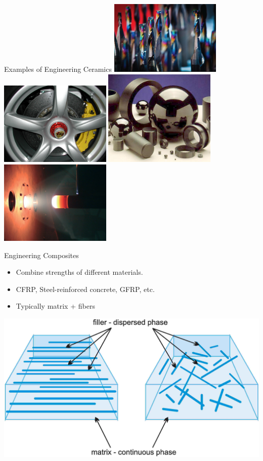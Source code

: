 \documentclass[10pt, svgnames]{beamer}
\begin{document}
\begin{frame}[label={sec:org6e82fde}]{Examples of Engineering Ceramics}
\centering
\includegraphics[width=0.4\textwidth]{pictures/diamond}
\includegraphics[width=0.4\textwidth]{pictures/silicon-carbide-disc-brake}
\includegraphics[width=0.4\textwidth]{pictures/silicon-nitride-bearing}
\includegraphics[width=0.4\textwidth]{pictures/ultra-high-temp}
\end{frame}


\begin{frame}[label={sec:org87434e0}]{Engineering Composites}
\begin{itemize}
\item Combine strengths of different materials.
\item CFRP, Steel-reinforced concrete, GFRP, etc.
\item Typically matrix + fibers
\end{itemize}

\centering
\includegraphics[height=0.4\textwidth]{pictures/matrix+fiber}
\end{frame}
\end{document}

